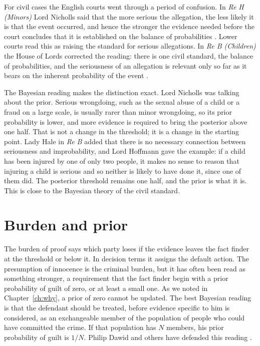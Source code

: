 For civil cases the English courts went through a period of confusion. In \emph{Re H (Minors)} Lord Nicholls said that the more serious the allegation, the less likely it is that the event occurred, and hence the stronger the evidence needed before the court concludes that it is established on the balance of probabilities \citep{reh1996}. Lower courts read this as raising the standard for serious allegations. In \emph{Re B (Children)} the House of Lords corrected the reading: there is one civil standard, the balance of probabilities, and the seriousness of an allegation is relevant only so far as it bears on the inherent probability of the event \citep{reb2008}.

The Bayesian reading makes the distinction exact. Lord Nicholls was talking about the prior. Serious wrongdoing, such as the sexual abuse of a child or a fraud on a large scale, is usually rarer than minor wrongdoing, so its prior probability is lower, and more evidence is required to bring the posterior above one half. That is not a change in the threshold; it is a change in the starting point. Lady Hale in \emph{Re B} added that there is no necessary connection between seriousness and improbability, and Lord Hoffmann gave the example: if a child has been injured by one of only two people, it makes no sense to reason that injuring a child is serious and so neither is likely to have done it, since one of them did. The posterior threshold remains one half, and the prior is what it is. This is close to the Bayesian theory of the civil standard.

\section{Burden and prior}

The burden of proof says which party loses if the evidence leaves the fact finder at the threshold or below it. In decision terms it assigns the default action. The presumption of innocence is the criminal burden, but it has often been read as something stronger, a requirement that the fact finder begin with a prior probability of guilt of zero, or at least a small one. As we noted in Chapter~\ref{ch:why}, a prior of zero cannot be updated. The best Bayesian reading is that the defendant should be treated, before evidence specific to him is considered, as an exchangeable member of the population of people who could have committed the crime. If that population has $N$ members, his prior probability of guilt is $1/N$. Philip Dawid and others have defended this reading \citep{dawid2002}.


